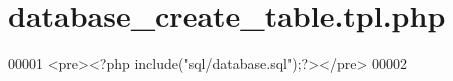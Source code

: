 \hypertarget{database__create__table_8tpl_8php}{\section{database\-\_\-create\-\_\-table.\-tpl.\-php}
\label{database__create__table_8tpl_8php}
}

\begin{DoxyCode}
00001         <pre><?php include(\textcolor{stringliteral}{"sql/database.sql"});?></pre>
00002 
\end{DoxyCode}
